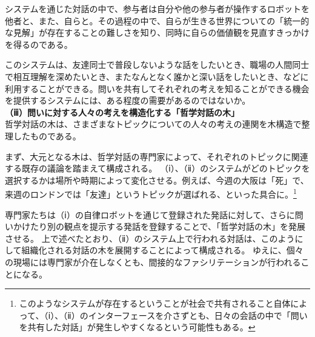 \documentclass[9pt,b5j,twoside,twocolumn]{utarticle}
\begin{document}
システムを通じた対話の中で、参与者は自分や他の参与者が操作するロボットを他者と、また、自らと。その過程の中で、自らが生きる世界についての「統一的な見解」が存在することの難しさを知り、同時に自らの価値観を見直すきっかけを得るのである。


このシステムは、友達同士で普段しないような話をしたいとき、職場の人間同士で相互理解を深めたいとき、またなんとなく誰かと深い話をしたいとき、などに利用することができる。問いを共有してそれぞれの考えを知ることができる機会を提供するシステムには、ある程度の需要があるのではないか。\\
\textbf{（ⅲ）問いに対する人々の考えを構造化する「哲学対話の木」}\\
哲学対話の木は、さまざまなトピックについての人々の考えの連関を木構造で整理したものである。


まず、大元となる木は、哲学対話の専門家によって、それぞれのトピックに関連する既存の議論を踏まえて構成される。
（ⅰ）、（ⅱ）のシステムがどのトピックを選択するかは場所や時期によって変化させる。例えば、今週の大阪は「死」で、来週のロンドンでは「友達」というトピックが選ばれる、といった具合に。\footnote{このようなシステムが存在するということが社会で共有されること自体によって、（ⅰ）、（ⅱ）のインターフェースを介さずとも、日々の会話の中で「問いを共有した対話」が発生しやすくなるという可能性もある。}



専門家たちは（ⅰ）の自律ロボットを通じて登録された発話に対して、さらに問いかけたり別の観点を提示する発話を登録することで、「哲学対話の木」を発展させる。%
上で述べたとおり、（ⅱ）のシステム上で行われる対話は、このようにして組織化される対話の木を展開することによって構成される。
ゆえに、個々の現場には専門家が介在しなくとも、間接的なファシリテーションが行われることになる。\\
\end{document}

